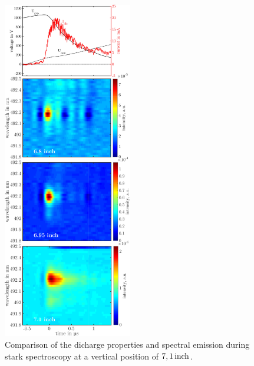 \documentclass[a4paper,10pt,twoside]{article}
\begin{document}
			\begin{figure}[t!]
				\centering
				\hspace{0.3cm}\includegraphics[width=0.5\textwidth,height=0.92\textheight]{figures/stark/combinations/starkallheightscombination.pdf}
				\caption{Comparison of the dicharge properties and spectral emission during stark spectroscopy at a vertical position of $\unit[7,1]{inch}$. }
				\label{img:stark71comparison}
			\end{figure}
		
\end{document}
